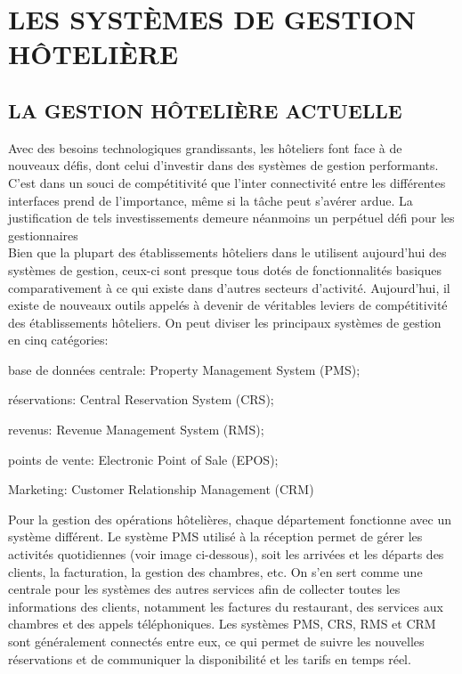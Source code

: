 \chapter{LES SYSTÈMES DE GESTION HÔTELIÈRE}
\section{LA GESTION HÔTELIÈRE ACTUELLE}

Avec des besoins technologiques grandissants, les hôteliers font face à de nouveaux défis, dont celui d’investir dans des systèmes de gestion performants. C’est dans un souci de compétitivité que l’inter connectivité entre les différentes interfaces prend de l’importance, même si la tâche peut s’avérer ardue. La justification de tels investissements demeure néanmoins un perpétuel défi pour les gestionnaires\\

Bien que la plupart des établissements hôteliers dans le utilisent aujourd’hui des systèmes de gestion, ceux-ci sont presque tous dotés de fonctionnalités basiques comparativement à ce qui existe dans d’autres secteurs d’activité. Aujourd’hui, il existe de nouveaux outils appelés à devenir de véritables leviers de compétitivité des établissements hôteliers. On peut diviser les principaux systèmes de gestion en cinq catégories:
\begin{list}{•}{ }
\item base de données centrale: Property Management System (PMS);
\item réservations: Central Reservation System (CRS);
\item revenus: Revenue Management System (RMS);
\item points de vente: Electronic Point of Sale (EPOS);
\item Marketing: Customer Relationship Management (CRM)\\
\end{list}

Pour la gestion des opérations hôtelières, chaque département fonctionne avec un système différent. Le système PMS utilisé à la réception permet de gérer les activités quotidiennes (voir image ci-dessous), soit les arrivées et les départs des clients, la facturation, la gestion des chambres, etc. On s’en sert comme une centrale pour les systèmes des autres services afin de collecter toutes les informations des clients, notamment les factures du restaurant, des services aux chambres et des appels téléphoniques. Les systèmes PMS, CRS, RMS et CRM sont généralement connectés entre eux, ce qui permet de suivre les nouvelles réservations et de communiquer la disponibilité et les tarifs en temps réel.\\

